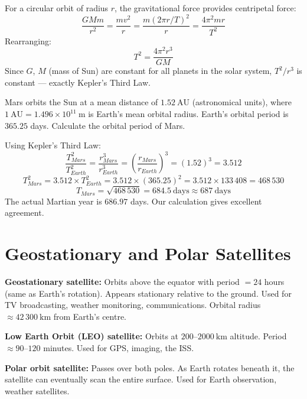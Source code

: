 \begin{processbox}
For a circular orbit of radius $r$, the gravitational
force provides centripetal force:
\[
  \frac{GMm}{r^2} = \frac{mv^2}{r}
  = \frac{m(2\pi r/T)^2}{r}
  = \frac{4\pi^2 mr}{T^2}
\]
Rearranging:
\[
  T^2 = \frac{4\pi^2 r^3}{GM}
\]
Since $G$, $M$ (mass of Sun) are constant for all
planets in the solar system, $T^2/r^3$ is constant ---
exactly Kepler's Third Law.
\end{processbox}
 
\begin{examplebox}[8.4]
Mars orbits the Sun at a mean distance of
$1.52\ \text{AU}$ (astronomical units), where
$1\ \text{AU} = 1.496\times10^{11}\ \text{m}$ is
Earth's mean orbital radius.
Earth's orbital period is $365.25$ days.
Calculate the orbital period of Mars.
\end{examplebox}
 
\begin{solutionbox}
Using Kepler's Third Law:
\[
  \frac{T_{Mars}^2}{T_{Earth}^2}
  = \frac{r_{Mars}^3}{r_{Earth}^3}
  = \left(\frac{r_{Mars}}{r_{Earth}}\right)^3
  = (1.52)^3 = 3.512
\]
\[
  T_{Mars}^2 = 3.512 \times T_{Earth}^2
  = 3.512 \times (365.25)^2
  = 3.512 \times 133\,408
  = 468\,530
\]
\[
  T_{Mars} = \sqrt{468\,530}
  = 684.5\ \text{days} \approx 687\ \text{days}
\]
The actual Martian year is $686.97$ days.
Our calculation gives excellent agreement.
\end{solutionbox}
 
\section{Geostationary and Polar Satellites}
 
\begin{definitionbox}
\textbf{Geostationary satellite:}
Orbits above the equator with period $= 24$ hours
(same as Earth's rotation). Appears stationary
relative to the ground. Used for TV broadcasting,
weather monitoring, communications.
Orbital radius $\approx 42\,300\ \text{km}$ from
Earth's centre.
 
\vspace{0.4cm}
 
\textbf{Low Earth Orbit (LEO) satellite:}
Orbits at $200$--$2000\ \text{km}$ altitude.
Period $\approx 90$--$120$ minutes. Used for GPS,
imaging, the ISS.
 
\vspace{0.4cm}
 
\textbf{Polar orbit satellite:}
Passes over both poles. As Earth rotates beneath it,
the satellite can eventually scan the entire surface.
Used for Earth observation, weather satellites.
\end{definitionbox}
 
